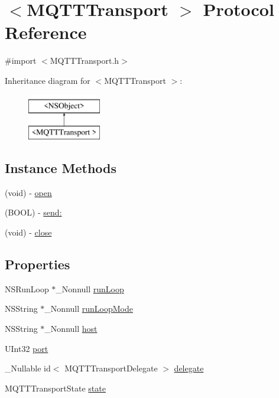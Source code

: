 \hypertarget{protocol_m_q_t_t_transport_01-p}{}\section{$<$M\+Q\+T\+T\+Transport $>$ Protocol Reference}
\label{protocol_m_q_t_t_transport_01-p}


{\ttfamily \#import $<$M\+Q\+T\+T\+Transport.\+h$>$}

Inheritance diagram for $<$M\+Q\+T\+T\+Transport $>$\+:\begin{figure}[H]
\begin{center}
\leavevmode
\includegraphics[height=2.000000cm]{protocol_m_q_t_t_transport_01-p}
\end{center}
\end{figure}
\subsection*{Instance Methods}
\begin{DoxyCompactItemize}
\item 
(void) -\/ \hyperlink{protocol_m_q_t_t_transport_01-p_a429a7bae51d2c25dcface523c2a75dae}{open}
\item 
(B\+O\+OL) -\/ \hyperlink{protocol_m_q_t_t_transport_01-p_adfba8a25ec9ae9cbc65d908018118555}{send\+:}
\item 
(void) -\/ \hyperlink{protocol_m_q_t_t_transport_01-p_a7a0c40f02204b591d3e47ee02d83c5e6}{close}
\end{DoxyCompactItemize}
\subsection*{Properties}
\begin{DoxyCompactItemize}
\item 
N\+S\+Run\+Loop $\ast$\+\_\+\+Nonnull \hyperlink{protocol_m_q_t_t_transport_01-p_a7b97ce4c4dcc299bcf68909cd31eb3d9}{run\+Loop}
\item 
N\+S\+String $\ast$\+\_\+\+Nonnull \hyperlink{protocol_m_q_t_t_transport_01-p_af671f3734cc589cfca98add6750ac45d}{run\+Loop\+Mode}
\item 
N\+S\+String $\ast$\+\_\+\+Nonnull \hyperlink{protocol_m_q_t_t_transport_01-p_a1ffe0631c337850b0bcbdd061a89b355}{host}
\item 
U\+Int32 \hyperlink{protocol_m_q_t_t_transport_01-p_a62ecc92bb9e7e1f0cd94b4add918c711}{port}
\item 
\+\_\+\+Nullable id$<$ M\+Q\+T\+T\+Transport\+Delegate $>$ \hyperlink{protocol_m_q_t_t_transport_01-p_a182ba6c4509d5b5e38ec0c783cd1b26d}{delegate}
\item 
M\+Q\+T\+T\+Transport\+State \hyperlink{protocol_m_q_t_t_transport_01-p_a599b4d50a3951a9effaa08895b45f340}{state}
\end{DoxyCompactItemize}


